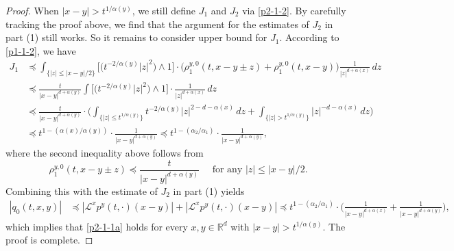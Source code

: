 \documentclass[a4paper,11pt]{amsart}
\renewcommand{\le}{\leqslant}
\newcommand{\R}{\mathds R}
\newcommand{\p}{\preceq}
\newcommand{\A}{\alpha}
\def\LL{{\mathcal L}}
\theoremstyle{definition}
\begin{document}
\begin{proof}
When $|x-y|>t^{{1}/{\A(y)}}$, we still define
$J_1$ and $J_2$ via \eqref{p2-1-2}. By carefully tracking the proof above, we find that the argument for the
estimates of $J_2$ in part (1) still works. So it remains to consider upper bound for
$J_1$.
According to \eqref{p1-1-2}, we have
\begin{align*}
J_1&\p \int_{\{|z|\le {|x-y|}/{2}\}}
\big[\big(t^{-{2}/{\A(y)}}|z|^2\big)\wedge 1\big] \cdot
\big(\rho_1^{y,0}(t,x-y\pm z)+\rho_1^{y,0}(t,x-y)\big)\frac{1}{|z|^{d+\A(x)}}\,dz\\
&\p \frac{t}{|x-y|^{d+\A(y)}}\int
\big[\big(t^{-{2}/{\A(y)}}|z|^2\big)\wedge 1\big] \cdot
\frac{1}{|z|^{d+\A(x)}}\,dz\\
&\p \frac{t}{|x-y|^{d+\A(y)}}\cdot \bigg(\int_{\{|z|\le t^{{1}/{\A(y)}}\}}
t^{-{2}/{\A(y)}}|z|^{2-d-\A(x)}\,dz+\int_{\{|z|> t^{{1}/{\A(y)}}\}}|z|^{-d-\A(x)}\,dz\bigg)\\
&\p t^{1-({\A(x)}/{\A(y)})}\cdot \frac{1}{|x-y|^{d+\A(y)}}\p t^{1-({\A_2}/{\A_1})}\cdot \frac{1}{|x-y|^{d+\A(y)}},
\end{align*}
where the second inequality above follows from
$$ \rho^{y,0}_1(t,x-y\pm z)\p \frac{t}{|x-y|^{d+\A(y)}}\quad\textrm{ for any }|z|\le {|x-y|}/{2}.$$
Combining this with the estimate of $J_2$ in part (1) yields
\begin{align*}
|q_0(t,x,y)|&\p
\left| \LL^x p^y(t,\cdot)(x-y)\right|+\left| \LL^xp^y(t,\cdot)(x-y)\right|\p t^{1-({\A_2}/{\A_1})}\cdot \bigg(\frac{1}{|x-y|^{d+\A(x)}}+\frac{1}{|x-y|^{d+\A(y)}}\bigg),
\end{align*}
which implies that \eqref{p2-1-1a} holds for every $x,y \in \R^d$ with $|x-y|>t^{{1}/{\A(y)}}$. The proof is complete.
\end{proof}
\end{document}
